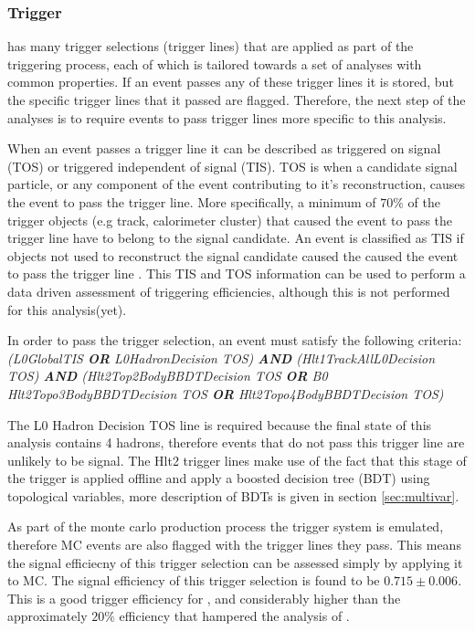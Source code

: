 \subsubsection{Trigger}
\label{sec:trigger}
\lhcb has many trigger selections (trigger lines) that are applied as part of the triggering process, each of which is tailored towards a set of analyses with common properties. If an event passes any of these trigger lines it is stored, but the specific trigger lines that it passed are flagged.  Therefore, the next step of the analyses is to require events to pass trigger lines more specific to this analysis.

When an event passes a trigger line it can be described as triggered on signal (TOS) or triggered independent of signal (TIS).  TOS is when a candidate signal particle, or any component of the event contributing to it's reconstruction, causes the event to pass the trigger line.  More specifically, a minimum of $70\%$ of the trigger objects (e.g track, calorimeter cluster) that caused the event to pass the trigger line have to belong to the signal candidate. An event is classified as TIS if objects not used to reconstruct the signal candidate caused the caused the event to pass the trigger line \cite{1748-0221-8-04-P04022}. This TIS and TOS information can be used to perform a data driven assessment of triggering efficiencies, although this is not performed for this analysis(yet)\cite{Tolk:1701134}.

In order to pass the trigger selection, an event must satisfy the following criteria:
\textit{
  (L0GlobalTIS \textbf{OR} L0HadronDecision TOS) \textbf{AND} (Hlt1TrackAllL0Decision TOS) \textbf{AND} (Hlt2Top2BodyBBDTDecision TOS \textbf{OR} B0 Hlt2Topo3BodyBBDTDecision TOS \textbf{OR} Hlt2Topo4BodyBBDTDecision TOS)
}

The L0 Hadron Decision TOS line is required because the final state of this analysis contains 4 hadrons, therefore events that do not pass this trigger line are unlikely to be signal.  The Hlt2 trigger lines make use of the fact that this stage of the trigger is applied offline and apply a boosted decision tree (BDT) using topological variables, more description of BDTs is given in section \ref{sec:multivar}.

As part of the monte carlo production process the \lhcb trigger system is emulated, therefore MC events are also flagged with the trigger lines they pass.  This means the signal efficiecny of this trigger selection can be assessed simply by applying it to MC.  The signal efficiency of this trigger selection is found to be $0.715\pm0.006$.  This is a good trigger efficiency for \lhcb, and considerably higher than the approximately $20\%$ efficiency that hampered the analysis of \Lb \to \Lz\etaz \cite{LHCb-PAPER-2015-019}.

